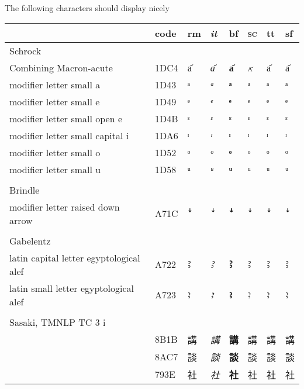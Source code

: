 The following characters should display nicely

\begin{tabularx}{\textwidth}{Xl l >{\itshape}l>{\bfseries}l>{\scshape}l>{\ttfamily}l>{\sffamily}l}
\lsptoprule
 & code & rm & it & bf & sc & tt & sf \\
\midrule
Schrock\\
\midrule
 Combining Macron-acute & 1DC4 & a᷄ & a᷄ & a᷄ & a᷄ & a᷄ &  a᷄  \\
modifier letter small a & 1D43 & ᵃ & ᵃ & ᵃ & ᵃ & ᵃ & ᵃ \\
modifier letter small e & 1D49 & ᵉ & ᵉ & ᵉ & ᵉ & ᵉ & ᵉ \\
modifier letter small open e& 1D4B & ᵋ & ᵋ & ᵋ & ᵋ & ᵋ & ᵋ \\
modifier letter small capital i& 1DA6 & ᶦ & ᶦ & ᶦ & ᶦ & ᶦ & ᶦ \\
modifier letter small o & 1D52 & ᵒ & ᵒ & ᵒ & ᵒ & ᵒ & ᵒ \\
modifier letter small u & 1D58 & ᵘ & ᵘ & ᵘ & ᵘ & ᵘ & ᵘ \\
\\
Brindle\\
\midrule
modifier letter raised down arrow  & A71C & ꜜ & ꜜ & ꜜ & ꜜ & ꜜ & ꜜ \\
\\
Gabelentz\\
\midrule
latin capital letter egyptological alef & A722 & Ꜣ & Ꜣ & Ꜣ & Ꜣ & Ꜣ & Ꜣ \\
latin small letter egyptological alef & A723 & ꜣ & ꜣ & ꜣ & ꜣ & ꜣ & ꜣ \\
\\
Sasaki, TMNLP TC 3 i\\
\midrule
 & 8B1B & 講 & 講 & 講 & 講 & 講 & 講 \\
 & 8AC7 & 談 & 談 & 談 & 談 & 談 & 談 \\
 & 793E & 社 & 社 & 社 & 社 & 社 & 社 \\
\end{tabularx}
